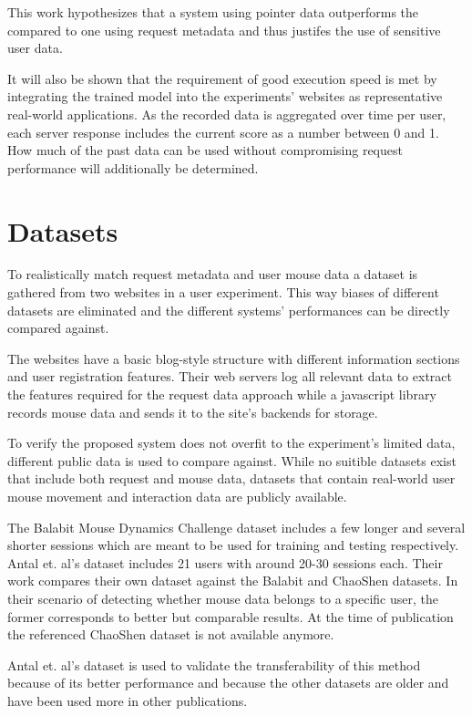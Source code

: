 \documentclass[
    fontsize=12pt,
    headings=small,
    parskip=half,           %
    bibliography=totoc,
    numbers=noenddot,       %
    open=any,               %
    final                   %
]{scrreprt}
\begin{document}
This work hypothesizes that a system using pointer data outperforms the compared to one using request metadata and thus justifes the use of sensitive user data.

It will also be shown that the requirement of good execution speed is met by integrating the trained model into the experiments' websites as representative real-world applications. As the recorded data is aggregated over time per user, each server response includes the current score as a number between 0 and 1. How much of the past data can be used without compromising request performance will additionally be determined.

\section{Datasets}

To realistically match request metadata and user mouse data a dataset is gathered from two websites in a user experiment. This way biases of different datasets are eliminated and the different systems' performances can be directly compared against.

The websites have a basic blog-style structure with different information sections and user registration features. Their web servers log all relevant data to extract the features required for the request data approach while a javascript library records mouse data and sends it to the site's backends for storage.

To verify the proposed system does not overfit to the experiment's limited data, different public data is used to compare against. While no suitible datasets exist that include both request and mouse data, datasets that contain real-world user mouse movement and interaction data are publicly available.

The Balabit Mouse Dynamics Challenge dataset \cite{BALABIT_CHALLENGE} includes a few longer and several shorter sessions which are meant to be used for training and testing respectively.
Antal et. al's dataset \cite{9111596} includes 21 users with around 20-30 sessions each. Their work compares their own dataset against the Balabit and ChaoShen datasets. In their scenario of detecting whether mouse data belongs to a specific user, the former corresponds to better but comparable results.
At the time of publication the referenced ChaoShen dataset is not available anymore.

Antal et. al's dataset is used to validate the transferability of this method because of its better performance and because the other datasets are older and have been used more in other publications.
\end{document}
